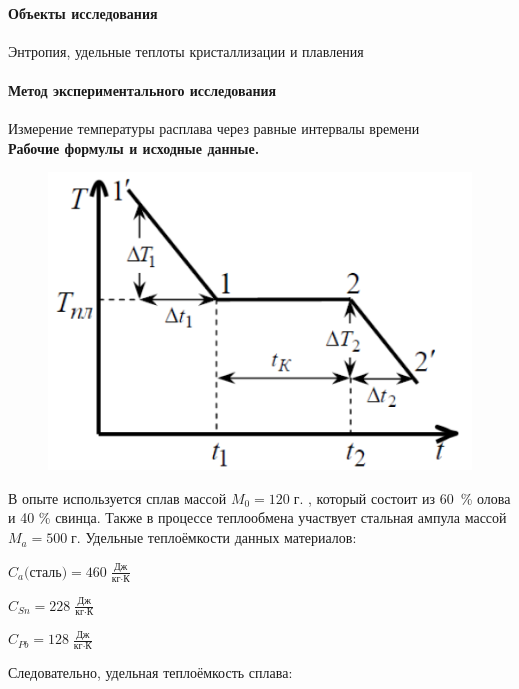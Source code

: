 \documentclass[a4paper]{scrartcl}
\begin{document}
\paragraph{Объекты исследования} Энтропия, удельные теплоты кристаллизации и плавления
\paragraph{Метод экспериментального исследования} Измерение температуры расплава через равные интервалы времени\\

 \textbf{Рабочие формулы и исходные данные.}

 	\begin{figure}[htb]
 		
 		 \begin{center}
 	 \includegraphics[scale=0.3]{plot}
 	   \end{center}
    \caption{}
 	\end{figure}


 В опыте используется сплав массой $ M_0=120\;\mbox{г.}$ , который состоит из 60~\% олова и 40 \% свинца. Также в процессе теплообмена участвует стальная  ампула массой $ M_a = 500\;\mbox{г.}$ Удельные теплоёмкости данных материалов:
 
 $ C_a\mbox{(сталь)} = 460\; \frac{\mbox{Дж}}{\mbox{кг} \cdot \mbox{К}}$
 
 $ C_{Sn} = 228\; \frac{\mbox{Дж}}{\mbox{кг} \cdot \mbox{К}}$
 
 $ C_{Pb} = 128\; \frac{\mbox{Дж}}{\mbox{кг} \cdot \mbox{К}}$
 
 Следовательно, удельная теплоёмкость сплава:
 
\end{document}
